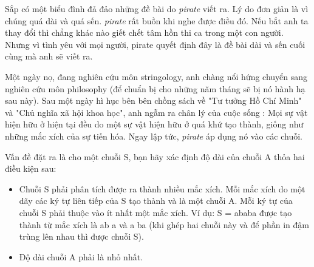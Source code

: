 Sắp có một biểu đình đả đảo những đề bài do       \textit{     pirate    }      viết ra. Lý do đơn giản là vì chúng quá dài và quá sến.   \textit{    pirate   }   rất buồn khi nghe được điều đó. Nếu bắt anh ta thay đổi thì chẳng khác nào giết chết tâm hồn thi ca trong một con người. Nhưng vì tình yêu với mọi người, pirate quyết định đây là đề bài dài và sến cuối cùng mà anh sẽ viết ra.  

   Một ngày nọ, đang nghiên cứu môn stringology, anh chàng nổi hứng chuyển sang nghiên cứu môn philosophy (để chuẩn bị cho những năm tháng sẽ bị nó hành hạ sau này). Sau một ngày hì hục bên bên chồng sách về "Tư tưởng Hồ Chí Minh" và "Chủ nghĩa xã hội khoa học", anh ngẫm ra chân lý của cuộc sống : Mọi sự vật hiện hữu ở hiện tại đều do một sự vật hiện hữu ở quá khứ tạo thành, giống như những mắc xích của sự tiến hóa. Ngay lập tức,   \textit{    pirate   }   áp dụng nó vào các chuỗi.  

   Vấn đề đặt ra là cho một chuỗi S, bạn hãy xác định độ dài của chuỗi A thỏa hai điều kiện sau:  
\begin{itemize}
	\item     Chuỗi S phải phân tích được ra thành nhiều mắc xích. Mỗi mắc xích do một dãy các ký tự liên tiếp của S tạo thành và là một chuỗi A. Mỗi ký tự của chuỗi S phải thuộc vào ít nhất một mắc xích. Ví dụ: S = ababa được tạo thành từ mắc xích là ab         a        và         a        ba (khi ghép hai chuỗi này và để phần in đậm trùng lên nhau thì được chuỗi S).   
	\item     Độ dài chuỗi A phải là nhỏ nhất.   
\end{itemize}

\